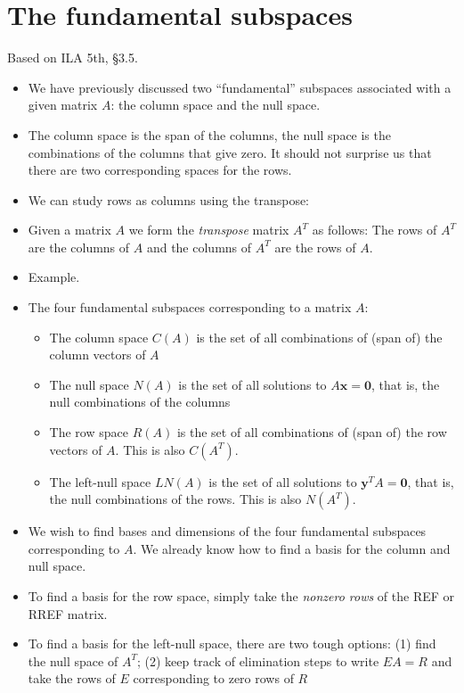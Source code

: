 \documentclass[11pt,oneside]{amsbook}
\theoremstyle{definition}
\theoremstyle{plain}
\theoremstyle{definition}
\theoremstyle{remark}
\numberwithin{equation}{section}
\numberwithin{figure}{section}
\begin{document}
\newpage
\section{The fundamental subspaces}

Based on ILA 5th, \S 3.5.

\begin{itemize}
\item We have previously discussed two ``fundamental'' subspaces associated with a given matrix $A$: the column space and the null space.
\item The column space is the span of the columns, the null space is the combinations of the columns that give zero. It should not surprise us that there are two corresponding spaces for the rows.
\item We can study rows as columns using the transpose:
\item Given a matrix $A$ we form the \emph{transpose} matrix $A^T$ as follows: The rows of $A^T$ are the columns of $A$ and the columns of $A^T$ are the rows of $A$.
\item Example.
\item The four fundamental subspaces corresponding to a matrix $A$:
  \begin{itemize}
  \item The column space $C(A)$ is the set of all combinations of (span of) the column vectors of $A$
  \item The null space $N(A)$ is the set of all solutions to $A\mathbf{x}=\mathbf{0}$, that is, the null combinations of the columns
  \item The row space $R(A)$ is the set of all combinations of (span of) the row vectors of $A$. This is also $C(A^T)$.
  \item The left-null space $LN(A)$ is the set of all solutions to $\mathbf{y}^TA=\mathbf{0}$, that is, the null combinations of the rows. This is also $N(A^T)$.
  \end{itemize}
\item We wish to find bases and dimensions of the four fundamental subspaces corresponding to $A$. We already know how to find a basis for the column and null space.
\item To find a basis for the row space, simply take the \emph{nonzero rows} of the REF or RREF matrix.
\item To find a basis for the left-null space, there are two tough options: (1) find the null space of $A^T$; (2) keep track of elimination steps to write $EA=R$ and take the rows of $E$ corresponding to zero rows of $R$

\end{itemize}
\end{document}
